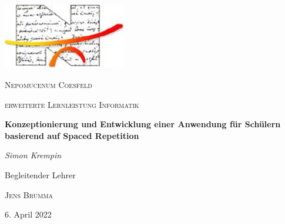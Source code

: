 \begin{titlepage}
	\centering
	\includegraphics[width=0.4\textwidth]{images/logo.png}\par\vspace{1cm}
	{\scshape\LARGE Nepomucenum Coesfeld \par}
	\vspace{1cm}
	{\scshape\Large erweiterte Lernleistung Informatik\par}
	\vspace{1.5cm}
	{\huge\bfseries Konzeptionierung und Entwicklung einer Anwendung für Schülern basierend auf Spaced Repetition\par}
	\vspace{2cm}
	{\Large\itshape Simon Krempin\par}
	\vfill
	Begleitender Lehrer\par
	\textsc{Jens Brumma}

	\vfill

	{\large 6. April 2022\par}
\end{titlepage}
\clearpage
\tableofcontents
{}
\clearpage
